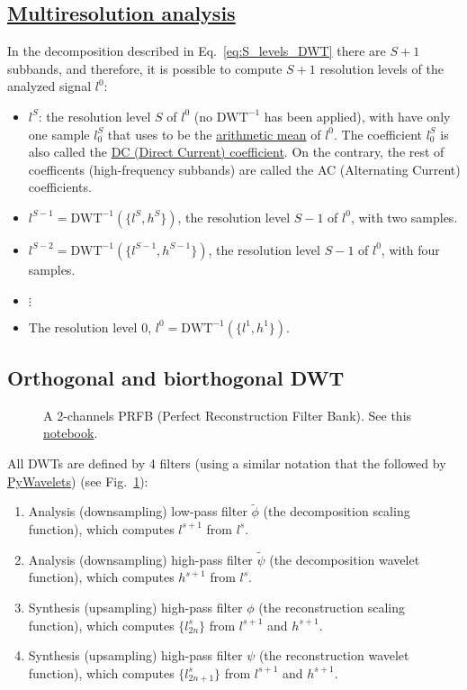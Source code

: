 \subsection{\href{https://en.wikipedia.org/wiki/Multiresolution_analysis}{Multiresolution analysis}}
In the decomposition described in Eq.~\ref{eq:S_levels_DWT} there are
$S+1$ subbands, and therefore, it is possible to compute $S+1$
resolution levels of the analyzed signal $l^0$:
\begin{itemize}
\item  $l^S$: the resolution level $S$ of $l^0$ (no $\text{DWT}^{-1}$ has been
  applied), with have only one sample $l^S_0$ that uses to be the
  \href{https://en.wikipedia.org/wiki/Arithmetic_mean}{arithmetic
    mean} of $l^0$. The coefficient $l^S_0$
  is also called the \href{https://en.wikipedia.org/wiki/DC_bias}{DC
    (Direct Current) coefficient}. On the contrary, the rest of
  coefficents (high-frequency subbands) are called the AC (Alternating
  Current) coefficients.
\item $l^{S-1}=\text{DWT}^{-1}(\{l^S, h^S\})$, the resolution level $S-1$ of $l^0$,
  with two samples.
\item $l^{S-2}=\text{DWT}^{-1}(\{l^{S-1}, h^{S-1}\})$, the resolution
  level $S-1$ of $l^0$, with four samples.
\item $\vdots$
\item The resolution level $0$, $l^0=\text{DWT}^{-1}(\{l^1, h^1\})$.
\end{itemize}  

\subsection{Orthogonal and biorthogonal DWT}

\begin{figure}
  \centering
  \caption{A 2-channels PRFB (Perfect Reconstruction Filter Bank). See
    this
    \href{https://github.com/Sistemas-Multimedia/Sistemas-Multimedia.github.io/blob/master/study_guide/07-DWT/PRFB.ipynb}{notebook}.}
  \label{fig:PRFB}
\end{figure}

All DWTs are defined by 4 filters (using a similar notation that the
followed by \href{https://pywavelets.readthedocs.io}{PyWavelets}) (see
Fig.~\ref{fig:PRFB}):
\begin{enumerate}
\item Analysis (downsampling) low-pass filter $\tilde\phi$ (the decomposition
  scaling function), which computes $l^{s+1}$ from $l^s$.
\item Analysis (downsampling) high-pass filter $\tilde\psi$ (the decomposition
  wavelet function), which computes $h^{s+1}$ from $l^s$.
\item Synthesis (upsampling) high-pass filter $\phi$ (the
  reconstruction scaling function), which computes $\{l^s_{2n}\}$ from
  $l^{s+1}$ and $h^{s+1}$.
\item Synthesis (upsampling) high-pass filter $\psi$ (the
  reconstruction wavelet function), which computes $\{l^s_{2n+1}\}$
  from $l^{s+1}$ and $h^{s+1}$.
\end{enumerate}


